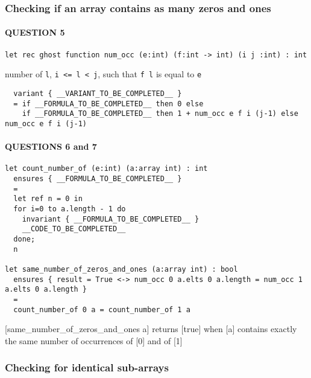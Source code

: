 \hypertarget{checking-if-an-array-contains-as-many-zeros-and-ones}{%
\subsubsection{Checking if an array contains as many zeros and
ones}\label{checking-if-an-array-contains-as-many-zeros-and-ones}}

\hypertarget{question-5}{%
\paragraph{QUESTION 5}\label{question-5}}

\begin{verbatim}
let rec ghost function num_occ (e:int) (f:int -> int) (i j :int) : int
\end{verbatim}

number of \texttt{l}, \texttt{i\ \textless{}=\ l\ \textless{}\ j}, such
that \texttt{f\ l} is equal to \texttt{e}

\begin{verbatim}
  variant { __VARIANT_TO_BE_COMPLETED__ }
  = if __FORMULA_TO_BE_COMPLETED__ then 0 else
    if __FORMULA_TO_BE_COMPLETED__ then 1 + num_occ e f i (j-1) else num_occ e f i (j-1)
\end{verbatim}

\hypertarget{questions-6-and-7}{%
\paragraph{QUESTIONS 6 and 7}\label{questions-6-and-7}}

\begin{verbatim}
let count_number_of (e:int) (a:array int) : int
  ensures { __FORMULA_TO_BE_COMPLETED__ }
  =
  let ref n = 0 in
  for i=0 to a.length - 1 do
    invariant { __FORMULA_TO_BE_COMPLETED__ }
    __CODE_TO_BE_COMPLETED__
  done;
  n

let same_number_of_zeros_and_ones (a:array int) : bool
  ensures { result = True <-> num_occ 0 a.elts 0 a.length = num_occ 1 a.elts 0 a.length }
  =
  count_number_of 0 a = count_number_of 1 a
\end{verbatim}

{[}same\_number\_of\_zeros\_and\_ones a{]} returns {[}true{]} when
{[}a{]} contains exactly the same number of occurrences of {[}0{]} and
of {[}1{]}

\hypertarget{checking-for-identical-sub-arrays}{%
\subsubsection{Checking for identical
sub-arrays}\label{checking-for-identical-sub-arrays}}

